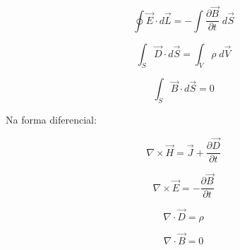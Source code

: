 \begin{equation}
	\oint \vec{E} \cdot d\vec{L} = - \int \frac{\partial \vec{B}}{\partial t} \; d\vec{S} 
\end{equation}

\begin{equation}
	\int_{S} \vec{D} \cdot d\vec{S} = \int_{V} \rho \; d\vec{V}
\end{equation}

\begin{equation}
	\int_{S} \vec{B} \cdot d\vec{S} = 0
\end{equation}

Na forma diferencial:

\begin{equation}
	\nabla \times \vec{H} = \vec{J}+\frac{\partial \vec{D}}{\partial t}
\end{equation}

\begin{equation}
	\nabla \times \vec{E} = - \frac{\partial \vec{B}}{\partial t}
\end{equation}

\begin{equation}
	\nabla \cdot \vec{D} = \rho
\end{equation}

\begin{equation}
	\nabla \cdot \vec{B} = 0
\end{equation}
